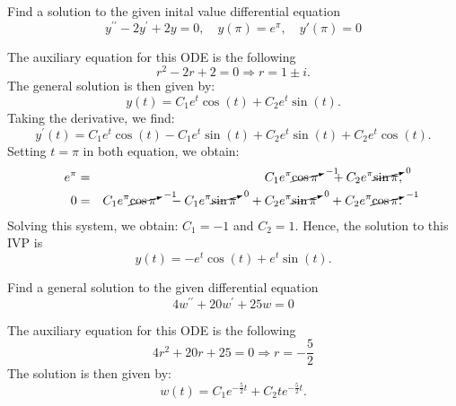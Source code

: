 \documentclass[11pt]{article}
\begin{document}
\begin{problem}
Find a solution to the given inital value differential equation
\begin{equation*}
y^{\prime \prime} -2 y^{\prime} +2 y =0, \quad y(\pi)=e^{\pi}, \quad  y'(\pi)=0
\end{equation*}
\end{problem}
\begin{solution}
The auxiliary equation for this ODE is the following
\begin{equation*}
r^2 -2r +2 =0 \Rightarrow r = 1 \pm i.
\end{equation*}
The general solution is then given by:
\begin{equation*}
y(t) = C_{1} e^{t} \cos(t) + C_{2} e^{t} \sin(t).
\end{equation*}
Taking the derivative, we find:
\begin{equation*}
y^{\prime}(t) = C_{1} e^{t} \cos(t) - C_{1} e^{t} \sin(t) + C_{2} e^{t} \sin(t) + C_{2} e^{t} \cos(t).
\end{equation*}
Setting $t=\pi$ in both equation, we obtain:
\begin{eqnarray*}
e^{\pi} &=& C_{1} e^{\pi}\cancelto{\scriptstyle -1}{\cos{\pi}} \quad+ C_{2} e^{\pi}\cancelto{\scriptstyle 0}{\sin{\pi}} ,\\
0 &=& C_{1} e^{\pi}\cancelto{\scriptstyle -1}{\cos{\pi}} \quad- C_{1} e^{\pi}\cancelto{\scriptstyle 0}{\sin{\pi}} \quad + C_{2} e^{\pi}\cancelto{\scriptstyle 0}{\sin{\pi}} \quad + C_{2} e^{\pi}\cancelto{\scriptstyle -1}{\cos{\pi}}.
\end{eqnarray*}
Solving this system, we obtain: $C_{1} = -1$ and $C_{2} = 1$.
Hence, the solution to this IVP is
\begin{equation*}
\boxed{ y(t) = -e^{t}\cos(t) + e^{t}\sin(t) }.
\end{equation*}
\end{solution}


\begin{problem}
Find a general solution to the given differential equation
\begin{equation*}
4 w^{\prime \prime} + 20 w^{\prime} +25 w =0
\end{equation*}
\end{problem}
\begin{solution}
The auxiliary equation for this ODE is the following
\begin{equation*}
4r^2 +20r +25 =0 \Rightarrow r = -\frac{5}{2}
\end{equation*}
The solution is then given by:
\begin{equation*}
\boxed{ w(t) = C_{1} e^{-\frac{5}{2} t} + C_{2} t e^{-\frac{5}{2}t}}.
\end{equation*}
\end{solution}
\end{document}
